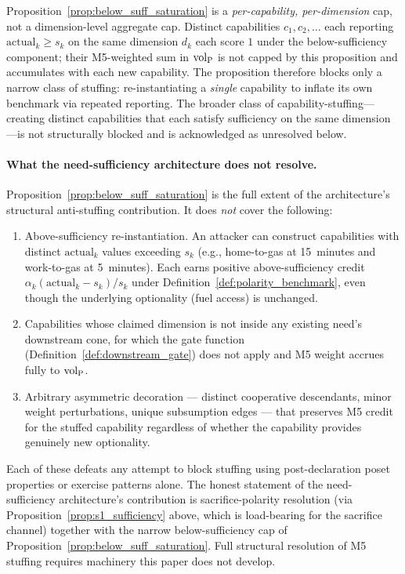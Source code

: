 \begin{remark}
\label{rem:pointwise_not_aggregate}
Proposition~\ref{prop:below_suff_saturation} is a
\emph{per-capability, per-dimension} cap, not a dimension-level
aggregate cap.  Distinct capabilities $c_1, c_2, \ldots$ each
reporting $\mathrm{actual}_k \geq s_k$ on the same dimension
$d_k$ each score $1$ under the below-sufficiency component;
their M5-weighted sum in ${\operatorname{vol}_{\mathrm{P}}}$ is not capped by this
proposition and accumulates with each new capability.  The
proposition therefore blocks only a narrow class of stuffing:
re-instantiating a \emph{single} capability to inflate its own
benchmark via repeated reporting.  The broader class of
capability-stuffing---creating distinct capabilities that each
satisfy sufficiency on the same dimension---is not structurally
blocked and is acknowledged as unresolved below.
\end{remark}

\paragraph{What the need-sufficiency architecture does not
resolve.}
Proposition~\ref{prop:below_suff_saturation} is the full extent
of the architecture's structural anti-stuffing contribution.  It
does \emph{not} cover the following:
\begin{enumerate}
\item[(i)] Above-sufficiency re-instantiation.  An attacker can
  construct capabilities with distinct
  $\mathrm{actual}_k$ values exceeding $s_k$ (e.g.,
  home-to-gas at 15~minutes and work-to-gas at 5~minutes).
  Each earns positive above-sufficiency credit
  $\alpha_k(\mathrm{actual}_k - s_k)/s_k$ under
  Definition~\ref{def:polarity_benchmark}, even though the
  underlying optionality (fuel access) is unchanged.
\item[(ii)] Capabilities whose claimed dimension is not inside
  any existing need's downstream cone, for which the gate
  function (Definition~\ref{def:downstream_gate}) does not
  apply and M5 weight accrues fully to ${\operatorname{vol}_{\mathrm{P}}}$.
\item[(iii)] Arbitrary asymmetric decoration --- distinct
  cooperative descendants, minor weight perturbations, unique
  subsumption edges --- that preserves M5 credit for the stuffed
  capability regardless of whether the capability provides
  genuinely new optionality.
\end{enumerate}
Each of these defeats any attempt to block stuffing using
post-declaration poset properties or exercise patterns alone.
The honest statement of the need-sufficiency architecture's
contribution is sacrifice-polarity resolution (via
Proposition~\ref{prop:s1_sufficiency} above, which is
load-bearing for the sacrifice channel) together with the
narrow below-sufficiency cap of
Proposition~\ref{prop:below_suff_saturation}.  Full structural
resolution of M5 stuffing requires machinery this paper does not
develop.


